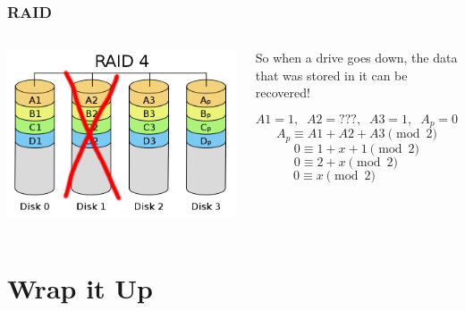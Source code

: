 \documentclass{beamer}
\theoremstyle{mystyle}
\begin{document}
\begin{frame}
\frametitle{RAID}

\begin{columns}
		\begin{center}
			\vspace{-1in}
			\includegraphics[scale=0.15]{disk1}	
		\end{center}
		\begin{center}
			So when a drive goes down, the data that was stored in it can be recovered! 
		
			\[A1 = 1, \; \; A2 = ???, \; \; A3 = 1, \;\; A_p =  0\]
		    \pause \[ A_p \equiv A1 + A2 + A3 \pmod 2 \]
		    \vspace*{-\baselineskip}\pause\[ 0 \equiv 1 + x + 1 \pmod2 \]
		    \vspace*{-\baselineskip}\pause\[ \; 0 \equiv 2 + x \pmod 2 \quad \quad \]
		   \vspace*{-\baselineskip} \pause \[ 0 \equiv x \pmod 2 \quad \quad \quad \;\; \]
		\end{center}
\end{columns}
 
\end{frame}

\section{Wrap it Up}

\frame{\tableofcontents[currentsection]}
\end{document}
